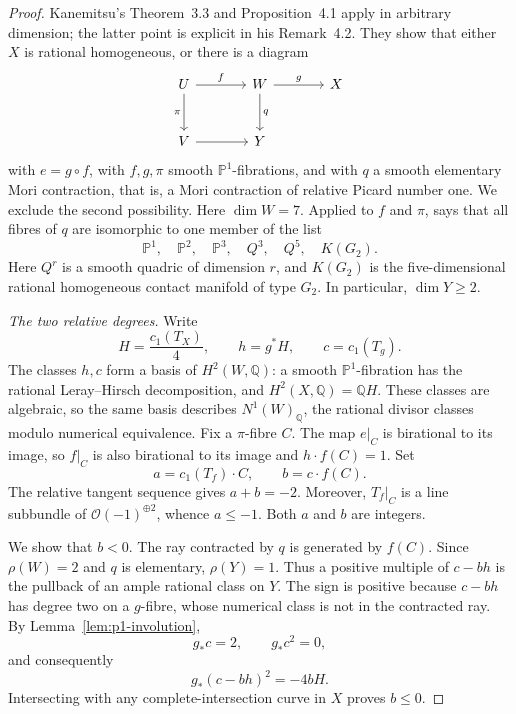\begin{proof}
Kanemitsu's Theorem~3.3 and Proposition~4.1
\cite{Kanemitsu2017} apply in arbitrary dimension; the latter point is
explicit in his Remark~4.2.
They show that either $X$ is rational homogeneous, or there is a diagram
\[
\begin{tikzcd}[column sep=large,row sep=large]
 U \arrow[r,"f"] \arrow[d,"\pi"'] &
 W \arrow[r,"g"] \arrow[d,"q"] & X\\
 V \arrow[r] & Y &
\end{tikzcd}
\]
with $e=g\circ f$, with $f,g,\pi$ smooth $\mathbb P^1$-fibrations,
and with $q$ a smooth elementary Mori contraction, that is, a Mori
contraction of relative Picard number one. We exclude the
second possibility. Here $\dim W=7$. Applied to $f$ and $\pi$,
\cite[Remark~2.3]{Kanemitsu2017} says that all fibres of $q$ are isomorphic to
one member of the list
\[
 \mathbb P^1,\quad\mathbb P^2,\quad\mathbb P^3,\quad
 Q^3,\quad Q^5,\quad K(G_2).
\]
Here $Q^r$ is a smooth quadric of dimension $r$, and $K(G_2)$ is the
five-dimensional rational homogeneous contact manifold of type $G_2$.
In particular, $\dim Y\ge2$.

\smallskip
\noindent\emph{The two relative degrees.}
Write
\[
 H=\frac{c_1(T_X)}4,\qquad h=g^*H,\qquad c=c_1(T_g).
\]
The classes $h,c$ form a basis of $H^2(W,\mathbb Q)$: a smooth
$\mathbb P^1$-fibration has the rational Leray--Hirsch decomposition,
and $H^2(X,\mathbb Q)=\mathbb QH$. These classes are algebraic, so
the same basis describes $N^1(W)_{\mathbb Q}$, the rational divisor
classes modulo numerical equivalence.
Fix a $\pi$-fibre $C$. The map $e|_C$ is birational to its image,
so $f|_C$ is also birational to its image and $h\cdot f(C)=1$.
Set
\[
 a=c_1(T_f)\cdot C,\qquad b=c\cdot f(C).
\]
The relative tangent sequence gives $a+b=-2$. Moreover,
$T_f|_C$ is a line subbundle of $\mathcal O(-1)^{\oplus2}$, whence
$a\le-1$. Both $a$ and $b$ are integers.

We show that $b<0$. The ray contracted by $q$ is generated by $f(C)$.
Since $\rho(W)=2$ and $q$ is elementary, $\rho(Y)=1$. Thus a
positive multiple of $c-bh$ is the pullback
of an ample rational class on $Y$. The sign is positive because
$c-bh$ has degree two on a $g$-fibre, whose numerical class is not
in the contracted ray. By Lemma~\ref{lem:p1-involution},
\[
 g_*c=2,\qquad g_*c^2=0,
\]
and consequently
\[
 g_*(c-bh)^2=-4bH.
\]
Intersecting with any complete-intersection curve in $X$ proves
$b\le0$.


\end{proof}
